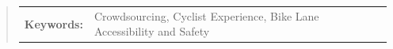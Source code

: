 \begin{abstract}




%
%


\begin{flushleft}
\begin{tabular}{lp{4.25in}}
\hspace{-0.5em}\textbf{Keywords:}\hspace{0.25em} & Crowdsourcing, Cyclist Experience, Bike Lane Accessibility and Safety
\end{tabular}
\end{flushleft}
\end{abstract}
